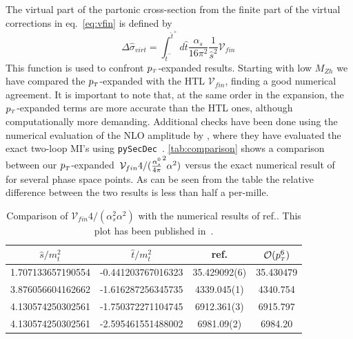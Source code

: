 The virtual part of the partonic cross-section
from the finite part of the virtual corrections in eq.~\eqref{eq:vfin} is defined  by
\begin{equation}
	\Delta \hat{\sigma}_{virt}=
	\int_{\hat{t}^-}^{\hat{t}^+} d\hat{t}
	\frac{\alpha_s}{16\pi^2}\frac{1}{\hat{s}^2}\mathcal{V}_{fin}\,
	\label{eq:deltasigma}
\end{equation}
This function is used to confront $p_{\scriptscriptstyle T}$-expanded results. Starting with low $M_{Zh}$ we have compared the $p_{\scriptscriptstyle T}$-expanded with the HTL 	$\mathcal{V}_{fin}$, finding a  good numerical agreement.
It is important to note that, at the same order in the expansion, 
the $p_{\scriptscriptstyle T}$-expanded terms are more accurate than
the HTL ones, although computationally more demanding.  Additional checks have been done using the numerical evaluation of the NLO amplitude by \cite{Chen:2020gae}, where they have evaluated the exact two-loop MI's using \texttt{pySecDec}~\cite{Borowka:2017idc,Borowka:2018goh}.  \autoref{tab:comparison} shows a comparison between our $p_{\scriptscriptstyle T}$-expanded~$\mathcal{V}_{fin} 4/(\frac{\alpha_s^0}{4 \pi}^2 \alpha^2)$ versus the exact numerical result of ~\cite{Chen:2020gae} for several phase space points. 
As can be seen from the table the relative difference 
between the two results is less than half a per-mille.
\begin{table}
	\renewcommand{\arraystretch}{1.2}
	\centering
	\begin{tabular}{| c| c | c | c| } \hline
		\rowcolor{lightgray}  $\hat{s}/m_t^2$ & $\hat{t}/m_t^2$ &  ref.\cite{Chen:2020gae} & $\mathcal{O}(p_{\scriptscriptstyle T}^6)$  \\ \hline 
		\cellcolor{lightgray} 1.707133657190554 & \cellcolor{lightgray} -0.441203767016323 & 35.429092(6) & 35.430479 \\
		\cellcolor{lightgray} 3.876056604162662 & \cellcolor{lightgray} -1.616287256345735 & 4339.045(1) & 4340.754 \\
		\cellcolor{lightgray} 4.130574250302561 & \cellcolor{lightgray} -1.750372271104745 & 6912.361(3) & 6915.797 \\
		\cellcolor{lightgray} 4.130574250302561 & \cellcolor{lightgray} -2.595461551488002 & 6981.09(2) & 6984.20  \\ \hline
	\end{tabular}
	\caption{Comparison of $\mathcal{V}_{fin} 4/(\alpha_s^2 \alpha^2)$ with the numerical results of ref.\cite{Chen:2020gae}. This plot has been published in~\cite{Alasfar:2021ppe}. \label{tab:comparison}}
\end{table}
